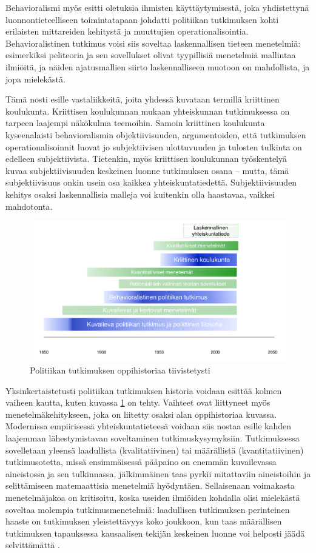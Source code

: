 \documentclass[finnish,gradu,twoside,12pt]{tktltiki}
\begin{document}
Behavioralismi myös esitti oletuksia ihmisten käyttäytymisestä, joka yhdistettynä luonnontieteelliseen toimintatapaan johdatti politiikan tutkimuksen kohti erilaisten mittareiden kehitystä ja muuttujien operationalisointia. Behavioralistinen tutkimus voisi siis soveltaa laskennallisen tieteen menetelmiä: esimerkiksi peliteoria ja sen sovellukset olivat tyypillisiä menetelmiä mallintaa ilmiöitä, ja näiden ajatusmallien siirto laskennalliseen muotoon on mahdollista, ja jopa mielekästä.

Tämä nosti esille vastaliikkeitä, joita yhdessä kuvataan termillä kriittinen koulukunta. Kriittisen koulukunnan mukaan yhteiskunnan tutkimuksessa on tarpeen laajempi näkökulma teemoihin. Samoin kriittinen koulukunta kyseenalaisti behavioralismin objektiivisuuden, argumentoiden, että tutkimuksen operationalisoinnit luovat jo subjektiivisen ulottuvuuden ja tulosten tulkinta on edelleen subjektiivista. Tietenkin, myös kriittisen koulukunnan työskentelyä kuvaa subjektiivisuuden keskeinen luonne tutkimuksen osana -- mutta, tämä subjektiivisuus onkin usein osa kaikkea yhteiskuntatiedettä. Subjektiivisuuden kehitys osaksi laskennallisia malleja voi kuitenkin olla haastavaa, vaikkei mahdotonta.

\begin{figure}
\includegraphics[width=12cm]{images/historia.pdf} 
\caption{Politiikan tutkimuksen oppihistoriaa tiivistetysti}
\label{fig:historia}
\end{figure}

Yksinkertaistetusti politiikan tutkimuksen historia voidaan esittää kolmen vaiheen kautta, kuten kuvassa \ref{fig:historia} on tehty. Vaihteet ovat liittyneet myös menetelmäkehitykseen, joka on liitetty osaksi alan oppihistoriaa kuvassa. Modernissa empiirisessä yhteiskuntatieteesä voidaan siis nostaa esille kahden laajemman lähestymistavan soveltaminen tutkimuskysymyksiin. Tutkimuksessa sovelletaan yleensä laadullista (kvalitatiivinen) tai määrällistä (kvantitatiivinen) tutkimusotetta, missä ensimmäisessä pääpaino on enemmän kuvailevassa aineistossa ja sen tulkinnassa, jälkimmäinen taas pyrkii mitattaviin aineistoihin ja selittämiseen matemaattisia menetelmiä hyödyntäen. Sellaisenaan voimakasta menetelmäjakoa on kritisoitu, koska useiden ilmiöiden kohdalla olisi mielekästä soveltaa molempia tutkimusmenetelmiä: laadullisen tutkimuksen perinteinen haaste on tutkimuksen yleistettävyys koko joukkoon, kun taas määrällisen tutkimuksen tapauksessa kausaalisen tekijän keskeinen luonne voi helposti jäädä selvittämättä \citep{ragin96,mcgraw96,silverman00}.
\end{document}
